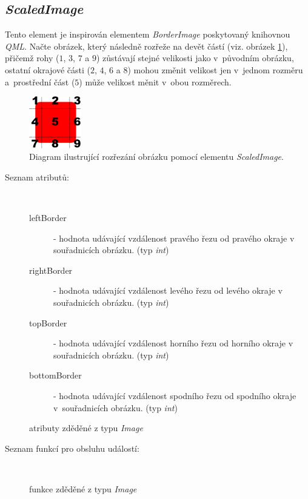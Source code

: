\documentclass[11pt,twoside,a4paper]{book}
\begin{document}
\subsection{\label{SEC:scaled}\textit{ScaledImage}}
Tento element je inspirován elementem \textit{BorderImage} poskytovaný knihovnou \textit{QML}. Načte obrázek, který následně rozřeže na devět částí (viz. obrázek \ref{fig:cut}), přičemž rohy ($1$, $3$, $7$ a $9$) zůstávají stejné velikosti jako v~původním obrázku, ostatní okrajové části ($2$, $4$, $6$ a $8$) mohou změnit velikost jen v~jednom rozměru a~prostřední část ($5$) může velikost měnit v~obou rozměrech.\\
\begin{figure}[!ht]
\begin{center}
  \includegraphics[width=0.2\textwidth]{imgCut}
\caption{{\label{fig:cut}}Diagram ilustrující rozřezání obrázku pomocí elementu \textit{ScaledImage}.}
\end{center}
\end{figure}
\begin{description}
\item[Seznam atributů:] ~
\begin{description}
\item[leftBorder] - hodnota udávající vzdálenost pravého řezu od pravého okraje v souřadnicích obrázku. (typ \textit{int})
\item[rightBorder] - hodnota udávající vzdálenost levého řezu od levého okraje v souřadnicích obrázku. (typ \textit{int})
\item[topBorder] - hodnota udávající vzdálenost horního řezu od horního okraje v souřadnicích obrázku. (typ \textit{int})
\item[bottomBorder] - hodnota udávající vzdálenost spodního řezu od spodního okraje v~souřadnicích obrázku. (typ \textit{int})
\item[atributy zděděné z typu \textit{Image}]
\end{description}
\item[Seznam funkcí pro obsluhu událostí:] ~
\begin{description}
\item[funkce zděděné z typu \textit{Image}]
\end{description}
\end{description}
\end{document}
